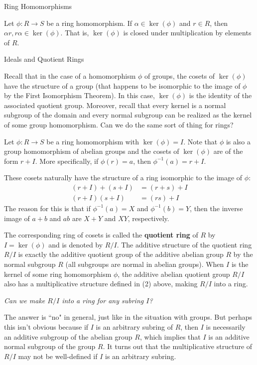 \begin{section}{Ring Homomorphisms}
\begin{theorem}
Let $\phi:R\to S$ be a ring homomorphism.  If $\alpha\in\ker(\phi)$ and $r\in R$, then $\alpha r, r\alpha\in \ker(\phi)$.  That is, $\ker(\phi)$ is closed under multiplication by elements of $R$.
\end{theorem}

\end{section}

\begin{section}{Ideals and Quotient Rings}

Recall that in the case of a homomorphism $\phi$ of groups, the cosets of $\ker(\phi)$ have the structure of a group (that happens to be isomorphic to the image of $\phi$ by the First Isomorphism Theorem).  In this case, $\ker(\phi)$ is the identity of the associated quotient group.  Moreover, recall that every kernel is a normal subgroup of the domain and every normal subgroup can be realized as the kernel of some group homomorphism.  Can we do the same sort of thing for rings?

Let $\phi:R\to S$ be a ring homomorphism with $\ker(\phi)=I$.  Note that $\phi$ is also a group homomorphism of abelian groups and the cosets of $\ker(\phi)$ are of the form $r+I$.  More specifically, if $\phi(r)=a$, then $\phi^{-1}(a)=r+I$.

These cosets naturally have the structure of a ring isomorphic to the image of $\phi$:
\begin{align}
(r+I)+(s+I) & =  (r+s)+I\\
(r+I)(s+I) & = (rs)+I
\end{align}
The reason for this is that if $\phi^{-1}(a)=X$ and $\phi^{-1}(b)=Y$, then the inverse image of $a+b$ and $ab$ are $X+Y$ and $XY$, respectively.

The corresponding ring of cosets is called the \textbf{quotient ring} of $R$ by $I=\ker(\phi)$ and is denoted by $R/I$.  The additive structure of the quotient ring $R/I$ is exactly the additive quotient group of the additive abelian group $R$ by the normal subgroup $R$ (all subgroups are normal in abelian groups).  When $I$ is the kernel of some ring homomorphism $\phi$, the additive abelian quotient group $R/I$ also has a multiplicative structure defined in (2) above, making $R/I$ into a ring.

\begin{center}
\emph{Can we make $R/I$ into a ring for any subring $I$?}
\end{center}

The answer is ``no" in general, just like in the situation with groups.  But perhaps this isn't obvious because if $I$ is an arbitrary subring of $R$, then $I$ is necessarily an additive subgroup of the abelian group $R$, which implies that $I$ is an additive normal subgroup of the group $R$.  It turns out that the multiplicative structure of $R/I$ may not be well-defined if $I$ is an arbitrary subring.


\end{section}
